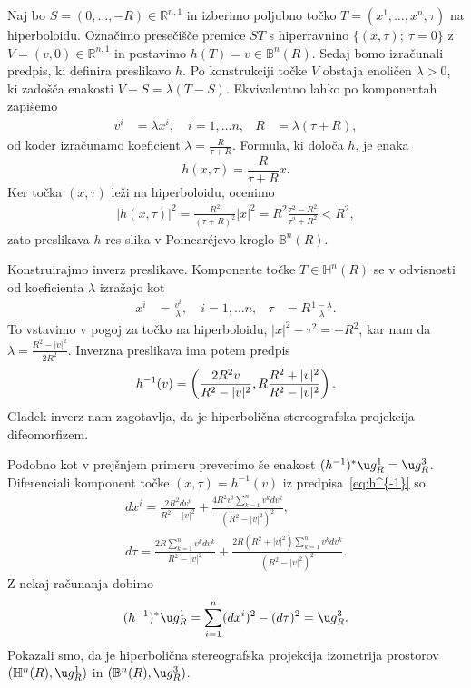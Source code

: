 \documentclass[a4paper]{article}
\begin{document}
Naj bo $S=(0, \dots , -R) \in \mathbb{R}^{n,1}$ in izberimo poljubno točko $T=(x^{1}, \dots , x^{n}, \tau)$ na hiperboloidu. Označimo presečišče premice $ST$ s hiperravnino $\{ (x, \tau); \ \tau=0 \}$ z $V=(v,0) \in \mathbb{R}^{n,1}$ in postavimo $h(T)=v \in \mathbb{B}^{n}(R)$.
Sedaj bomo izračunali predpis, ki definira preslikavo $h$.
Po konstrukciji točke $V$ obstaja enoličen $\lambda>0$, ki zadošča enakosti $V-S=\lambda(T-S)$. Ekvivalentno lahko po komponentah zapišemo
\begin{align*}
v^{i} &= \lambda x^{i}, \quad  i=1, \dots n, & R &= \lambda(\tau+R),
\end{align*}
od koder izračunamo koeficient $\lambda = \frac{R}{\tau+R}$. Formula, ki določa $h$, je enaka
\begin{equation}\label{eq: hip-ster-proj}
h(x,\tau) = \frac{R}{\tau+R}x.
\end{equation}
Ker točka $(x,\tau)$ leži na hiperboloidu, ocenimo
\begin{gather*}
|h(x,\tau)|^2 = \frac{R^2}{(\tau+R)^2} |x|^2 = R^2 \frac{\tau^2-R^2}{\tau^2+R^2} < R^2,
\end{gather*}
zato preslikava $h$ res slika v Poincar\'ejevo kroglo $\mathbb{B}^{n}(R)$.

Konstruirajmo inverz preslikave. Komponente točke $T \in \mathbb{H}^{n}(R)$ se v odvisnosti od koeficienta $\lambda$ izražajo kot
\begin{align*}
x^{i} &= \frac{v^{i}}{\lambda}, \quad  i=1, \dots n, & \tau &= R \frac{1-\lambda}{\lambda}.
\end{align*}
To vstavimo v pogoj za točko na hiperboloidu, $|x|^2-\tau^2=-R^2$, kar nam da $\lambda = \frac{R^2-|v|^2}{2R^2}$.
Inverzna preslikava ima potem predpis
\begin{equation}\label{eq:h^{-1}}
h^{-1}(v) = \left( \frac{2R^2v}{R^2-|v|^2}, R \frac{R^2+|v|^2}{R^2-|v|^2} \right).
\end{equation} 
Gladek inverz nam zagotavlja, da je hiperbolična stereografska projekcija difeomorfizem.

Podobno kot v prejšnjem primeru preverimo še enakost $(h^{-1})^{*} \u g_{R}^{1} = \u g_{R}^{3}$.
Diferenciali komponent točke $(x,\tau)=h^{-1}(v)$ iz predpisa~\ref{eq:h^{-1}} so
\begin{gather*}
dx^{i} = \frac{2R^2dv^{i}}{R^2-|v|^2} + \frac{4R^2v^{i} \sum_{k=1}^{n}v^{k}dv^{k}}{(R^2-|v|^2)^2}, \\
d\tau = \frac{2R \sum_{k=1}^{n}v^{k}dv^{k}}{R^2-|v|^2} + \frac{2R(R^2+|v|^2) \sum_{k=1}^{n}v^{k}dv^{k}}{(R^2-|v|^2)^2}.
\end{gather*}
Z nekaj računanja dobimo
\begin{gather*}
(h^{-1})^{*} \u g_{R}^{1} = \sum_{i=1}^{n} (dx^{i})^2 - (d\tau)^2 = \u g_{R}^{3}. 
\end{gather*}
Pokazali smo, da je hiperbolična stereografska projekcija izometrija prostorov $(\mathbb{H}^{n}(R), \u g_{R}^{1})$ in $(\mathbb{B}^{n}(R), \u g_{R}^{3})$.
\end{document}
